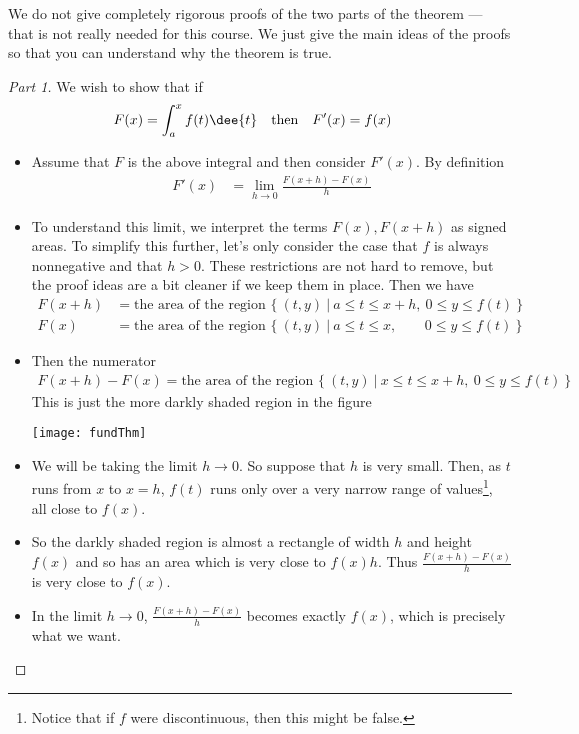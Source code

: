 We do not give completely rigorous proofs of the two parts of the theorem ---
that is not really needed for this course. We just give the main ideas of the
proofs so that you can understand why the theorem is true.
\begin{proof}[Part 1] We wish to show that if
\begin{align*}
  F(x) &= \int_a^x f(t) \dee{t} & \text{then}&&
  F'(x) &= f(x)
\end{align*}
\begin{itemize}
 \item Assume that $F$ is the above integral and then consider $F'(x)$. By
  definition
  \begin{align*}
  F'(x) &=\lim_{h\rightarrow 0} \frac{F(x+h)-F(x)}{h}
  \end{align*}

\item To understand this limit, we interpret the terms $F(x), F(x+h)$ as signed
areas. To simplify this further, let's only consider the case that $f$ is always
nonnegative and that $h>0$. These restrictions are not hard to remove, but the
proof ideas are a bit cleaner if we keep them in place. Then we have
\begin{align*}
F(x+h)&=\text{the area of the region $\big\{\ (t,y)\ \big|\ a\le t\le x+h,\
                0\le y\le f(t)\ \big\}$} \\
F(x)&=\text{the area of the region $\big\{\ (t,y)\ \big|\ a\le t\le x,
                  \phantom{+h\ \,}\
                                             0\le y\le f(t)\ \big\}$}
\end{align*}

\item Then the numerator
\begin{align*}
F(x+h)-F(x)=\text{the area of the region $\big\{\ (t,y)\ \big|\ x\le t\le x+h,\
                0\le y\le f(t)\ \big\}$}
\end{align*}
This is just the more darkly shaded region in the figure
\begin{efig}
\begin{center}
    \texttt{[image: fundThm]}
\end{center}
\end{efig}

\item We will be taking the limit $h\rightarrow 0$. So suppose that $h$ is
very small. Then, as $t$ runs from $x$ to $x=h$, $f(t)$ runs only over
a very narrow range of values\footnote{Notice that if $f$ were
discontinuous, then this might be false.}, all close to $f(x)$.

\item So the darkly shaded region is almost a rectangle of width $h$ and height
$f(x)$ and so has an area which is very close to $f(x)h$. Thus
$\frac{F(x+h)-F(x)}{h}$ is very close to $f(x)$.
\item In the limit $h\rightarrow 0$, $\frac{F(x+h)-F(x)}{h}$ becomes
exactly $f(x)$, which is precisely what we want.
\end{itemize}
\end{proof}
